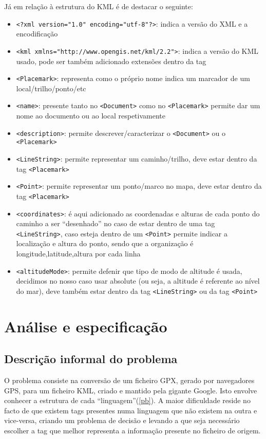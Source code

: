 \documentclass{llncs}
\begin{document}
Já em relação à estrutura do KML é de destacar o seguinte:
\begin{itemize}
    \item \verb|<?xml version="1.0" encoding="utf-8"?>|: indica a versão do XML e a encodificação 
    \item \verb|<kml xmlns="http://www.opengis.net/kml/2.2">|: indica a versão do KML usado, pode ser também adicionado extensões dentro da tag
    \item \verb|<Placemark>|: representa como o próprio nome indica um marcador de um local/trilho/ponto/etc
    \item \verb|<name>|: presente tanto no \verb|<Document>| como no \verb|<Placemark>| permite dar um nome ao documento ou ao local respetivamente
    \item \verb|<description>|: permite descrever/caracterizar o \verb|<Document>| ou o \verb|<Placemark>|
    \item \verb|<LineString>|: permite representar um caminho/trilho, deve estar dentro da tag \verb|<Placemark>|
    \item \verb|<Point>|: permite representar um ponto/marco no mapa, deve estar dentro da tag \verb|<Placemark>|
    \item \verb|<coordinates>|: é aqui adicionado as coordenadas e alturas de cada ponto do caminho a ser ``desenhado'' no caso de estar dentro de uma tag \verb|<LineString>|, caso esteja dentro de um \verb|<Point>| permite indicar a localização e altura do ponto, sendo que a organização é longitude,latitude,altura por cada linha
    \item \verb|<altitudeMode>|: permite defenir que tipo de modo de altitude é usada, decidimos no nosso caso usar absolute (ou seja, a altitude é referente ao nível do mar), deve também estar dentro da tag \verb|<LineString>| ou da tag \verb|<Point>|
\end{itemize}

\section{Análise e especificação}

\subsection{Descrição informal do problema}
O problema consiste na conversão de um ficheiro GPX, gerado por navegadores GPS, para um ficheiro KML, criado e mantido pela gigante Google. Isto envolve conhecer a estrutura de cada ``linguagem''(\ref{pb}). A maior dificuldade reside no facto de que existem tags presentes numa linguagem que não existem na outra e vice-versa, criando um problema de decisão e levando a que seja necessário escolher a tag que melhor representa a informação presente no ficheiro de origem.
\end{document}
